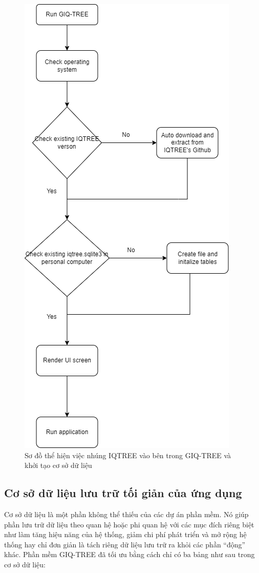 \documentclass[12pt]{report}
\begin{document}
\begin{figure}[h]
	\centering
	\includegraphics[scale=0.65]{Image/4.2.png}
	\caption{Sơ đồ thể hiện việc nhúng IQTREE vào bên trong GIQ-TREE và khởi tạo cơ sở dữ liệu }
	\label{fig:image4.2}
\end{figure}

\subsection{Cơ sở dữ liệu lưu trữ tối giản của ứng dụng}
Cơ sở dữ liệu là một phần không thể thiếu của các dự án phần mềm. Nó giúp phần lưu trữ dữ liệu theo quan hệ hoặc phi quan hệ với các mục đích riêng biệt như làm tăng hiệu năng của hệ thống, giảm chi phí phát triển và mở rộng hệ thống hay chỉ đơn giản là tách riêng dữ liệu lưu trữ ra khỏi các phần “động” khác. Phần mềm GIQ-TREE đã tối ưu bằng cách chỉ có ba bảng như sau trong cơ sở dữ liệu: 
\end{document}
